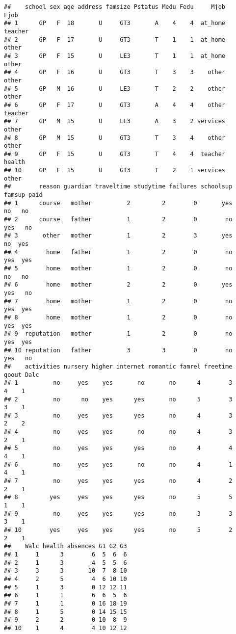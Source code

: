 \documentclass[]{book}
\begin{document}
\begin{verbatim}
##    school sex age address famsize Pstatus Medu Fedu     Mjob    Fjob
## 1      GP   F  18       U     GT3       A    4    4  at_home teacher
## 2      GP   F  17       U     GT3       T    1    1  at_home   other
## 3      GP   F  15       U     LE3       T    1    1  at_home   other
## 4      GP   F  16       U     GT3       T    3    3    other   other
## 5      GP   M  16       U     LE3       T    2    2    other   other
## 6      GP   F  17       U     GT3       A    4    4    other teacher
## 7      GP   M  15       U     LE3       A    3    2 services   other
## 8      GP   M  15       U     GT3       T    3    4    other   other
## 9      GP   F  15       U     GT3       T    4    4  teacher  health
## 10     GP   F  15       U     GT3       T    2    1 services   other
##        reason guardian traveltime studytime failures schoolsup famsup paid
## 1      course   mother          2         2        0       yes     no   no
## 2      course   father          1         2        0        no    yes   no
## 3       other   mother          1         2        3       yes     no  yes
## 4        home   father          1         2        0        no    yes  yes
## 5        home   mother          1         2        0        no     no   no
## 6        home   mother          2         2        0       yes    yes   no
## 7        home   mother          1         2        0        no    yes  yes
## 8        home   mother          1         2        0        no    yes  yes
## 9  reputation   mother          1         2        0        no    yes  yes
## 10 reputation   father          3         3        0        no    yes   no
##    activities nursery higher internet romantic famrel freetime goout Dalc
## 1          no     yes    yes       no       no      4        3     4    1
## 2          no      no    yes      yes       no      5        3     3    1
## 3          no     yes    yes      yes       no      4        3     2    2
## 4          no     yes    yes       no       no      4        3     2    1
## 5          no     yes    yes      yes       no      4        4     4    1
## 6          no     yes    yes       no       no      4        1     4    1
## 7          no     yes    yes      yes       no      4        2     2    1
## 8         yes     yes    yes      yes       no      5        5     1    1
## 9          no     yes    yes      yes       no      3        3     3    1
## 10        yes     yes    yes      yes       no      5        2     2    1
##    Walc health absences G1 G2 G3
## 1     1      3        6  5  6  6
## 2     1      3        4  5  5  6
## 3     3      3       10  7  8 10
## 4     2      5        4  6 10 10
## 5     1      3        0 12 12 11
## 6     1      1        6  6  5  6
## 7     1      1        0 16 18 19
## 8     1      5        0 14 15 15
## 9     2      2        0 10  8  9
## 10    1      4        4 10 12 12
\end{verbatim}
\end{document}
